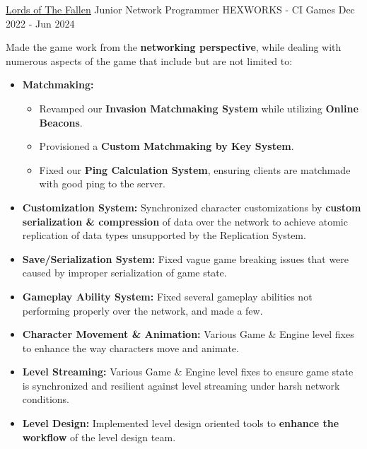 \begin{cventries}
  \cventry
    {\href{https://wizardcell.com/about/lords-of-the-fallen}{\underline{Lords of The Fallen}}} %
    {Junior Network Programmer} %
    {HEXWORKS - CI Games} %
    {Dec 2022 - Jun 2024} %
    {
      \begin{cvitems} %
        \item {Made the game work from the \textbf{networking perspective}, while dealing with numerous aspects of the game that include but are not limited to:
          \begin{itemize}
            \item {\textbf{Matchmaking:}
              \begin{itemize}
                \item {Revamped our \textbf{Invasion Matchmaking System} while utilizing \textbf{Online Beacons}.}
                \item {Provisioned a \textbf{Custom Matchmaking by Key System}.}
                \item {Fixed our \textbf{Ping Calculation System}, ensuring clients are matchmade with good ping to the server.}
              \end{itemize}
            }
            \item {\textbf{Customization System:} Synchronized character customizations by \textbf{custom serialization \& compression} of data over the network to achieve atomic replication of data types unsupported by the Replication System.}
            \item {\textbf{Save/Serialization System:} Fixed vague game breaking issues that were caused by improper serialization of game state.}
            \item {\textbf{Gameplay Ability System:} Fixed several gameplay abilities not performing properly over the network, and made a few.}
            \item {\textbf{Character Movement \& Animation:} Various Game \& Engine level fixes to enhance the way characters move and animate.}
            \item {\textbf{Level Streaming:} Various Game \& Engine level fixes to ensure game state is synchronized and resilient against level streaming under harsh network conditions.}
            \item {\textbf{Level Design:} Implemented level design oriented tools to \textbf{enhance the workflow} of the level design team.}

\end{itemize}}
\end{cvitems}}
\end{cventries}
